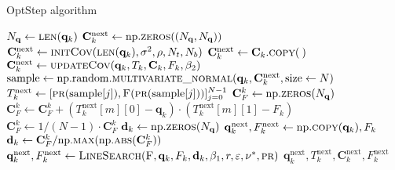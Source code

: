 \begin{algorithm}[H]%
\caption{\label{OptStep}OptStep algorithm}
\begin{algorithmic}[1]
\State $N_\mathbf{q}\gets\Call{len}{\mathbf{q}_k}$
\State $\mathbf{C}^\mathrm{next}_k \gets \mathrm{np.}\Call{zeros}{(N_\mathbf{q}, N_\mathbf{q})}$
\label{alg2differ1}
\State $\mathbf{C}^\mathrm{next}_k \gets \Call{initCov}{\protect\Call{len}{\mathbf{q}_k}, \sigma^2, \rho, N_t, N_b}$
\Else
\State $\mathbf{C}^\mathrm{next}_k \gets \mathbf{C}_k.\Call{copy}{\:}$
\EndIf\label{alg2differ2}
\Else
\State $\mathbf{C}^\mathrm{next}_k \gets \Call{updateCov}{\mathbf{q}_k, T_k, \mathbf{C}_k, F_k ,\beta_2}$
\EndIf
\State $\mathrm{sample} \gets \mathrm{np.random.}\Call{multivariate\_normal}{\mathbf{q}_k, \mathbf{C}^\mathrm{next}_k, \mathrm{size} \gets N}$
\State \label{OptStepFOMCall1}$T^\mathrm{next}_k\gets[\Call{pr}{\mathrm{sample}[j]},\Call{F}{\protect\Call{pr}{\mathrm{sample}[j]}}]_{j=0}^{N-1}$
\State $\mathbf{C}^k_F \gets \mathrm{np.}\Call{zeros}{N_\mathbf{q}}$
\State $\mathbf{C}^k_F \gets \mathbf{C}^k_F+(T^\mathrm{next}_k[m][0]-\mathbf{q}_k)\cdot(T^\mathrm{next}_k[m][1]-F_k)$
\EndFor
\State $\mathbf{C}^k_F \gets 1/(N-1)\cdot\mathbf{C}^k_F$
\State $\mathbf{d}_k \gets \mathrm{np.}\Call{zeros}{N_\mathbf{q}}$
\State $\mathbf{q}^\mathrm{next}_{k}, F^\mathrm{next}_k \gets \mathrm{np.}\Call{copy}{\mathbf{q}_k},F_k$
\label{alg2differ3}
\State $\mathbf{d}_k \gets \mathbf{C}^k_F/\mathrm{np.}\Call{max}{\mathrm{np.}\protect\Call{abs}{\mathbf{C}^k_F}}$
\State \label{OptStepFOMCall2}$\mathbf{q}^\mathrm{next}_{k}, F^\mathrm{next}_k \gets \Call{LineSearch}{\textproc{F},\mathbf{q}_k,F_k,\mathbf{d}_k,\beta_1,r,\varepsilon,\nu^*,\textproc{pr}}$
\EndIf
\State \Return $\mathbf{q}^\mathrm{next}_k,T^\mathrm{next}_k,\mathbf{C}^\mathrm{next}_k,F^\mathrm{next}_k$
\EndFunction
\end{algorithmic}
\end{algorithm}

